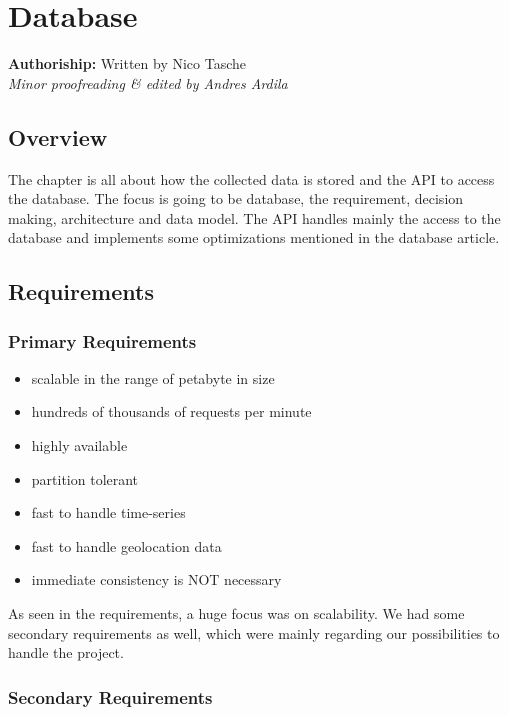\section{Database}\label{sec:database}

\textbf{Authoriship: } Written by Nico Tasche\\
\emph{Minor proofreading \& edited by Andres Ardila} \\

\vspace*{4mm}

\subsection{Overview}\label{overview}

The chapter is all about how the collected data is stored and the API to
access the database. The focus is going to be database, the requirement,
decision making, architecture and data model. The API handles mainly the
access to the database and implements some optimizations mentioned in
the database article.

\subsection{Requirements}\label{requirements}

\subsubsection{Primary Requirements}\label{primary-requirements}

\begin{itemize}
\tightlist
\item
  scalable in the range of petabyte in size
\item
  hundreds of thousands of requests per minute
\item
  highly available
\item
  partition tolerant
\item
  fast to handle time-series
\item
  fast to handle geolocation data
\item
  immediate consistency is NOT necessary
\end{itemize}

As seen in the requirements, a huge focus was on scalability. We had
some secondary requirements as well, which were mainly regarding our
possibilities to handle the project.

\subsubsection{Secondary Requirements}\label{secondary-requirements}


